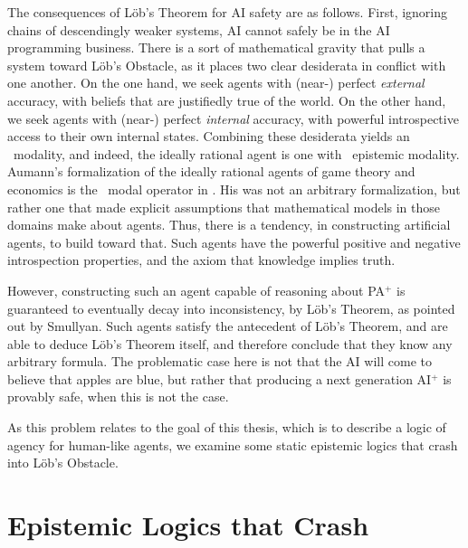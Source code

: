 The consequences of L\"ob's Theorem for AI safety are as follows. First, ignoring chains of descendingly weaker systems, AI cannot safely be in the AI programming business. There is a sort of mathematical gravity that pulls a system toward L\"ob's Obstacle, as it places two clear desiderata in conflict with one another. On the one hand, we seek agents with (near-) perfect \emph{external} accuracy, with beliefs that are justifiedly true of the world. On the other hand, we seek agents with (near-) perfect \emph{internal} accuracy, with powerful introspective access to their own internal states. Combining these desiderata yields an \SFive\ modality, and indeed, the ideally rational agent is one with \SFive\ epistemic modality. Aumann's formalization of the ideally rational agents of game theory and economics is the \SFive\ modal operator in \cite{Aumann}. His was not an arbitrary formalization, but rather one that made explicit assumptions that mathematical models in those domains make about agents. Thus, there is a tendency, in constructing artificial agents, to build toward that. Such agents have the powerful positive and negative introspection properties, and the axiom that knowledge implies truth.

However, constructing such an agent capable of reasoning about PA$^{+}$ is guaranteed to eventually decay into inconsistency, by L\"ob's Theorem, as pointed out by Smullyan. Such agents satisfy the antecedent of L\"ob's Theorem, and are able to deduce L\"ob's Theorem itself, and therefore conclude that they know any arbitrary formula. The problematic case here is not that the AI will come to believe that apples are blue, but rather that producing a next generation AI$^+$ is provably safe, when this is not the case.

As this problem relates to the goal of this thesis, which is to describe a logic of agency for human-like agents, we examine some static epistemic logics that crash into L\"ob's Obstacle.



\section{Epistemic Logics that Crash}
\label{sec:crashing_logics}
